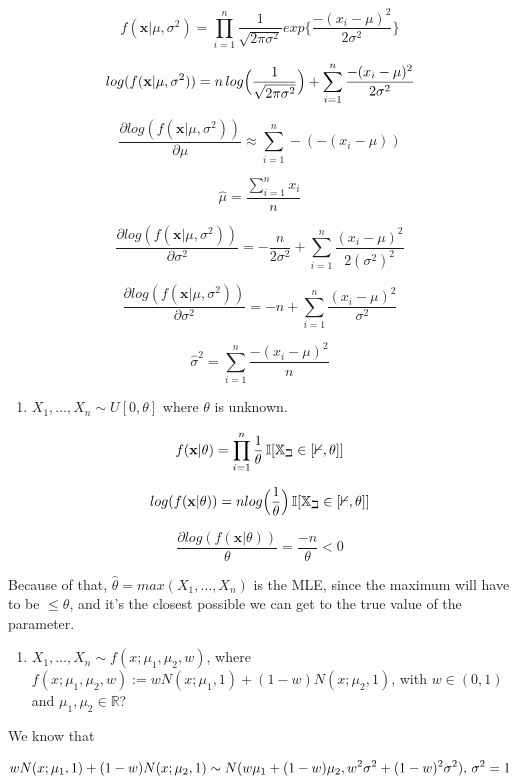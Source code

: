 \documentclass[]{article}
\providecommand{\tightlist}{%
  \setlength{\itemsep}{0pt}\setlength{\parskip}{0pt}}
\begin{document}
\[f(\mathbf{x} | \mu, \sigma^2) =  \prod_{i = 1}^{n} 
\frac{1}{\sqrt{2\pi\sigma^2}} exp \{\frac{-(x_i - \mu)^2}{2 \sigma^2} \}\]

\[ log(f(\mathbf{x} | \mu, \sigma^2)) = n \thinspace log\Big(\frac{1}{\sqrt{2\pi\sigma^2}}\Big) + 
\sum_{i = 1}^{n} \frac{-(x_i - \mu)^2}{2 \sigma^2} \]

\[ 
\frac{\partial log(f(\mathbf{x} | \mu, \sigma^2))}{\partial \mu} \approx   \sum_{i = 1}^{n} -(-(x_i - \mu))
\]

\[\hat \mu =  \frac{\sum_{i = 1}^{n} x_i}{n}\]

\[ 
\frac{\partial log(f(\mathbf{x} | \mu, \sigma^2))}{\partial \sigma^2} 
=   
-\frac{n}{2\sigma^2} + \sum_{i = 1}^{n} \frac{(x_i - \mu)^2}
{2 (\sigma^2)^2} 
\]

\[ 
\frac{\partial log(f(\mathbf{x} | \mu, \sigma^2))}{\partial \sigma^2} 
=   
-n  + \sum_{i = 1}^{n} \frac{(x_i - \mu)^2}
{\sigma^2} 
\]

\[\hat \sigma^2 = \sum_{i = 1}^{n} \frac{-(x_i - \mu)^2}{n}\]

\begin{enumerate}
\def\labelenumi{(\alph{enumi})}
\setcounter{enumi}{1}
\tightlist
\item
  \(X_1,\dots,X_n \sim U[0,\theta]\) where \(\theta\) is unknown.
\end{enumerate}

\[f(\mathbf{x} | \theta) =  \prod_{i = 1}^{n} \frac{1}{\theta} \thinspace \mathbb{I[X_i \in [0, \theta]]}\]

\[log(f(\mathbf{x} | \theta)) =  n log\Big(\frac{1}{\theta}\Big) \thinspace \mathbb{I[X_i \in [0, \theta]]}\]

\[ \frac{\partial log(f(\mathbf{x} | \theta))}{\theta} = 
\frac{-n}{\theta} < 0\]

Because of that, \(\hat \theta = max(X_1,\dots,X_n)\) is the MLE, since
the maximum will have to be \(\leq \theta\), and it's the closest
possible we can get to the true value of the parameter.

\begin{enumerate}
\def\labelenumi{(\alph{enumi})}
\setcounter{enumi}{2}
\tightlist
\item
  \(X_1,\dots,X_n \sim f(x; \mu_1, \mu_2, w)\), where
  \(f(x; \mu_1, \mu_2, w) := wN(x; \mu_1, 1) + (1 - w)N(x; \mu_2,1)\),
  with \(w \in (0, 1)\) and \(\mu_1, \mu_2 \in \mathbb{R}\)?
\end{enumerate}

We know that

\[ wN(x; \mu_1, 1) + (1 - w)N(x; \mu_2,1) \sim
N(w \mu_1 + (1 - w)\mu_2, w^2 \sigma^2 +  (1-w)^2 \sigma^2), 
\thinspace \sigma^2 = 1\]
\end{document}
